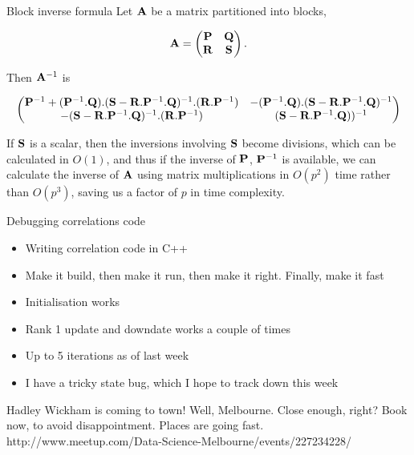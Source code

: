 \documentclass{beamer}
\begin{document}
\begin{frame}{Block inverse formula}
Let ${\bf A}$ be a matrix partitioned into blocks,

\small
\begin{equation*}
{\bf A} = \begin{pmatrix}
{\bf P} & {\bf Q} \\
{\bf R} & {\bf S}
\end{pmatrix}.
\end{equation*}
\normalsize

Then ${\bf A}^{-1}$ is

\small
\begin{equation*}
\begin{pmatrix}
{\bf P}^{-1} + ({\bf P}^{-1}.{\bf Q}).({\bf S} - {\bf R}.{\bf P}^{-1}.{\bf Q})^{-1}.({\bf R}.{\bf P}^{-1}) & -({\bf P}^{-1}.{\bf Q}).({\bf S} - {\bf R}.{\bf P}^{-1}.{\bf Q})^{-1} \\
-({\bf S} - {\bf R}.{\bf P}^{-1}.{\bf Q})^{-1}.({\bf R}.{\bf P}^{-1}) & ({\bf S} - {\bf R}.{\bf P}{^{-1}.{\bf Q}}))^{-1}
\end{pmatrix}
\end{equation*}
\normalsize

If ${\bf S}$ is a scalar, then the inversions involving ${\bf S}$ become divisions, which can be calculated in $O(1)$,
and thus if the inverse of ${\bf P}$, ${\bf P}^{-1}$ is available, we can calculate the inverse of ${\bf A}$ using matrix
multiplications in $O(p^2)$ time rather than $O(p^3)$, saving us a factor of $p$ in time complexity.

\end{frame}

\begin{frame}{Debugging correlations code}
\begin{itemize}
\item Writing correlation code in C++
\item Make it build, then make it run, then make it right. Finally, make it fast
\item Initialisation works
\item Rank 1 update and downdate works a couple of times
\item Up to 5 iterations as of last week
\item I have a tricky state bug, which I hope to track down this week
\end{itemize}
\end{frame}

\begin{frame}{Hadley Wickham is coming to town!}
Well, Melbourne. Close enough, right?
Book now, to avoid disappointment. Places are going fast. http://www.meetup.com/Data-Science-Melbourne/events/227234228/
\end{frame}
\end{document}
